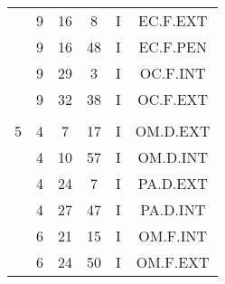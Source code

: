 \documentclass[12pt, a4paper]{article}
\begin{document}
\begin{multicols}{3}
{\begin{tabular}{c c c c c c}
	 	 	 	 & 9 & 16 & 8 & I & EC.F.EXT\\%
	 	 	 	 & 9 & 16 & 48 & I & EC.F.PEN\\%
	 	 	 	 & 9 & 29 & 3 & I & OC.F.INT\\%
	 	 	 	 & 9 & 32 & 38 & I & OC.F.EXT\\%
	 	 	 	 & & & & & \\%
	 	 	 	5 & 4 & 7 & 17 & I & OM.D.EXT\\%
	 	 	 	 & 4 & 10 & 57 & I & OM.D.INT\\%
	 	 	 	 & 4 & 24 & 7 & I & PA.D.EXT\\%
	 	 	 	 & 4 & 27 & 47 & I & PA.D.INT\\%
	 	 	 	 & 6 & 21 & 15 & I & OM.F.INT\\%
	 	 	 	 & 6 & 24 & 50 & I & OM.F.EXT\\%
	 	 \end{tabular}
 	}
\end{multicols}
\end{document}
